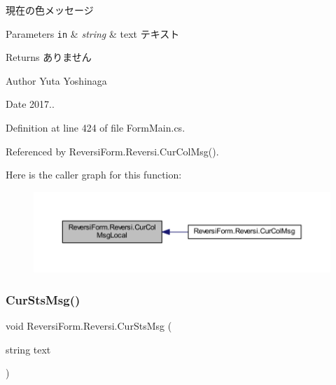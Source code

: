 現在の色メッセージ 


\begin{DoxyParams}[1]{Parameters}
\mbox{\tt in}  & {\em string} & text テキスト \\
\hline
\end{DoxyParams}
\begin{DoxyReturn}{Returns}
ありません 
\end{DoxyReturn}
\begin{DoxyAuthor}{Author}
Yuta Yoshinaga 
\end{DoxyAuthor}
\begin{DoxyDate}{Date}
2017.. 
\end{DoxyDate}


Definition at line 424 of file Form\+Main.\+cs.



Referenced by Reversi\+Form.\+Reversi.\+Cur\+Col\+Msg().

Here is the caller graph for this function\+:\nopagebreak
\begin{figure}[H]
\begin{center}
\leavevmode
\includegraphics[width=350pt]{class_reversi_form_1_1_reversi_a0d919be21fe5961a177e26b5752320b9_icgraph}
\end{center}
\end{figure}
\mbox{\label{class_reversi_form_1_1_reversi_af5009aa7b1b255b9dec7028d8a7c53f7}} 
\subsubsection{\texorpdfstring{Cur\+Sts\+Msg()}{CurStsMsg()}}
{\footnotesize\ttfamily void Reversi\+Form.\+Reversi.\+Cur\+Sts\+Msg (\begin{DoxyParamCaption}\item[{string}]{text }\end{DoxyParamCaption})}



